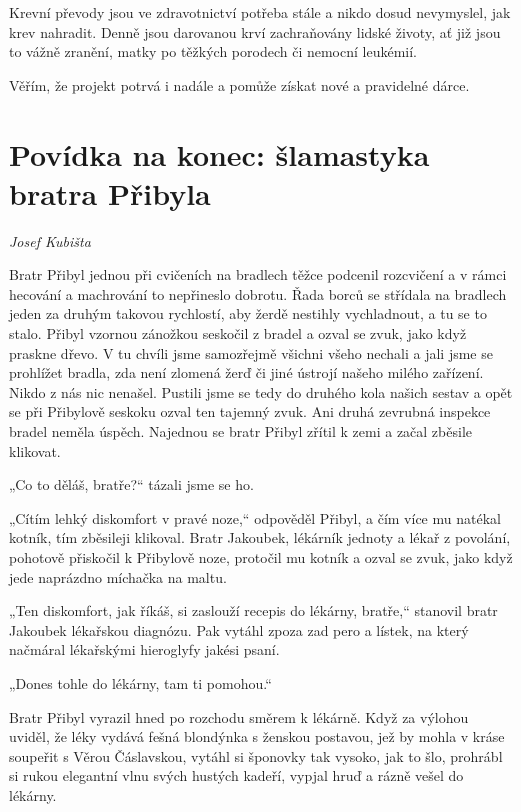 Krevní převody jsou ve zdravotnictví potřeba stále a nikdo dosud
nevymyslel, jak krev nahradit. Denně jsou darovanou krví zachraňovány
lidské životy, ať již jsou to vážně zranění, matky po těžkých porodech
či nemocní leukémií.

Věřím, že projekt potrvá i nadále a pomůže získat nové a pravidelné
dárce.

\section{Povídka na konec: šlamastyka bratra
Přibyla}\label{povuxeddka-na-konec-ux161lamastyka-bratra-pux159ibyla}

\emph{Josef Kubišta}

Bratr Přibyl jednou při cvičeních na bradlech těžce podcenil rozcvičení
a v rámci hecování a machrování to nepřineslo dobrotu. Řada borců se
střídala na bradlech jeden za druhým takovou rychlostí, aby žerdě
nestihly vychladnout, a tu se to stalo. Přibyl vzornou zánožkou seskočil
z bradel a ozval se zvuk, jako když praskne dřevo. V tu chvíli jsme
samozřejmě všichni všeho nechali a jali jsme se prohlížet bradla, zda
není zlomená žerď či jiné ústrojí našeho milého zařízení. Nikdo z nás
nic nenašel. Pustili jsme se tedy do druhého kola našich sestav a opět
se při Přibylově seskoku ozval ten tajemný zvuk. Ani druhá zevrubná
inspekce bradel neměla úspěch. Najednou se bratr Přibyl zřítil k zemi a
začal zběsile klikovat.

„Co to děláš, bratře?{}`` tázali jsme se ho.

„Cítím lehký diskomfort v pravé noze,`` odpověděl Přibyl, a čím více mu
natékal kotník, tím zběsileji klikoval. Bratr Jakoubek, lékárník jednoty
a lékař z povolání, pohotově přiskočil k Přibylově noze, protočil mu
kotník a ozval se zvuk, jako když jede naprázdno míchačka na maltu.

„Ten diskomfort, jak říkáš, si zaslouží recepis do lékárny, bratře,``
stanovil bratr Jakoubek lékařskou diagnózu. Pak vytáhl zpoza zad pero a
lístek, na který načmáral lékařskými hieroglyfy jakési psaní.

„Dones tohle do lékárny, tam ti pomohou.``

Bratr Přibyl vyrazil hned po rozchodu směrem k lékárně. Když za výlohou
uviděl, že léky vydává fešná blondýnka s ženskou postavou, jež by mohla
v kráse soupeřit s Věrou Čáslavskou, vytáhl si šponovky tak vysoko, jak
to šlo, prohrábl si rukou elegantní vlnu svých hustých kadeří, vypjal
hruď a rázně vešel do lékárny.

